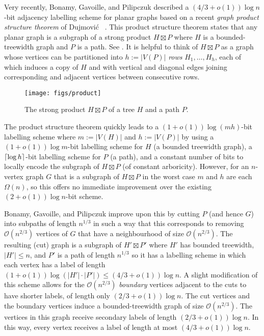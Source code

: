 \documentclass[kpfonts]{patmorin}
\newcommand{\Oh}{\mathcal{O}}
\let\le\leqslant
\begin{document}
Very recently, Bonamy, Gavoille, and Pilipczuk \cite{bonamy.gavoille.ea:shorter} described a $(4/3+o(1))\log n$-bit adjacency labelling scheme for planar graphs based on a recent \emph{graph product structure theorem} of Dujmović \etal\ \cite{dujmovic.joret.ea:planar}.  This product structure theorem states that any planar graph is a subgraph of a strong product $H\boxtimes P$ where $H$ is a bounded-treewidth graph and $P$ is a path. See . It is helpful to think of $H\boxtimes P$ as a graph whose vertices can be partitioned into $h:=|V(P)|$ \emph{rows} $H_1,\ldots,H_{h}$, each of which induces a copy of $H$ and with vertical and diagonal edges joining corresponding and adjacent vertices between consecutive rows.

\begin{figure}[htbp]
  \begin{center}
    \texttt{[image: figs/product]}
  \end{center}
  \caption{The strong product $H\boxtimes P$ of a tree $H$ and a path $P$.}
\end{figure}

The product structure theorem quickly leads to a $(1+o(1))\log(mh)$-bit labelling scheme where $m:=|V(H)|$ and $h:=|V(P)|$ by using a $(1+o(1))\log m$-bit labelling scheme for $H$ (a bounded treewidth graph), a ${\lceil \log{h} \rceil}$-bit labelling scheme for $P$ (a path), and a constant number of bits to locally encode the subgraph of $H\boxtimes P$ (of constant arboricity).  However, for an $n$-vertex graph $G$ that is a subgraph of $H\boxtimes P$ in the worst case $m$ and $h$ are each $\Omega(n)$, so this offers no immediate improvement over the existing $(2+o(1))\log n$-bit scheme.

Bonamy, Gavoille, and Pilipczuk improve upon this by cutting $P$ (and hence $G$) into subpaths of length $n^{1/3}$ in such a way that this corresponds to removing $\Oh(n^{2/3})$ vertices of $G$ that have a neighbourhood of size $\Oh(n^{2/3})$. The resulting (cut) graph is a subgraph of $H'\boxtimes P'$ where $H'$ has bounded treewidth, $|H'|\le n$, and $P'$ is a path of length $n^{1/3}$ so it has a labelling scheme in which each vertex has a label of length $(1+o(1))\log (|H'|\cdot|P'|) \le (4/3+o(1))\log n$.  A slight modification of this scheme allows for the $\Oh(n^{2/3})$ \emph{boundary} vertices adjacent to the cuts to have shorter labels, of length only $(2/3+o(1))\log n$.  The cut vertices and the boundary vertices induce a bounded-treewidth graph of size $\Oh(n^{2/3})$.  The vertices in this graph receive secondary labels of length $(2/3+o(1))\log n$.  In this way, every vertex receives a label of length at most $(4/3 + o(1))\log n$.
\end{document}
